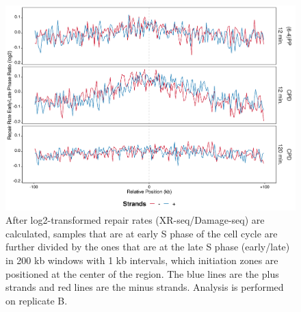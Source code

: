 \begin{figure}[H]
\begin{center}
\includegraphics[width=\textwidth]{Chapters/7_appendix/figures/supfig41}
\caption[Repair rate early/late ratio of initiation zones in 200 kb (replicate B).]{After log2-transformed repair rates (XR-seq/Damage-seq) are calculated, samples that are at early S phase of the cell cycle are further divided by the ones that are at the late S phase (early/late) in 200 kb windows with 1 kb intervals, which initiation zones are positioned at the center of the region. The blue lines are the plus strands and red lines are the minus strands. Analysis is performed on replicate B.}
\label{supfig:rrel200inzonesB}
\end{center}
\end{figure}

